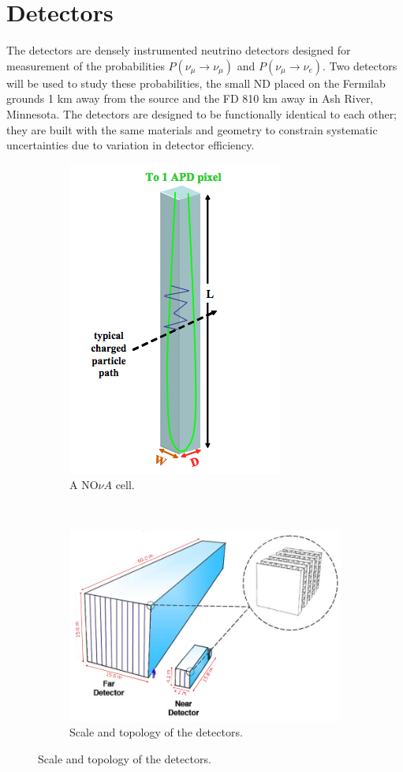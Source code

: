 \section{\nova Detectors}
\label{sec:detectors}
The \nova detectors are densely instrumented neutrino detectors designed for measurement of the probabilities $P(\nu_\mu \rightarrow \nu_\mu)$ and $P(\nu_\mu \rightarrow \nu_e)$.  Two detectors will be used to study these probabilities, the small ND placed on the Fermilab grounds 1 km away from the \numi source and the FD 810 km away in Ash River, Minnesota.  The detectors are designed to be functionally identical to each other; they are built with the same materials and geometry to constrain systematic uncertainties due to variation in detector efficiency. 

\begin{figure}[t]
\begin{subfigure}[t]{0.25\textwidth}
                \includegraphics[height=0.35\textheight]{figures/figures/cell.png}
               \caption{A NO$\nu A$ cell.}
                 \label{cell}
        \end{subfigure}
        ~
\begin{subfigure}[t]{0.75\textwidth}
                \centering
                \includegraphics[height=0.35\textheight]{figures/figures/detectors.png}
               \caption{Scale and topology of the \nova detectors.}
                \label{detector}


\end{subfigure}
\end{figure}
